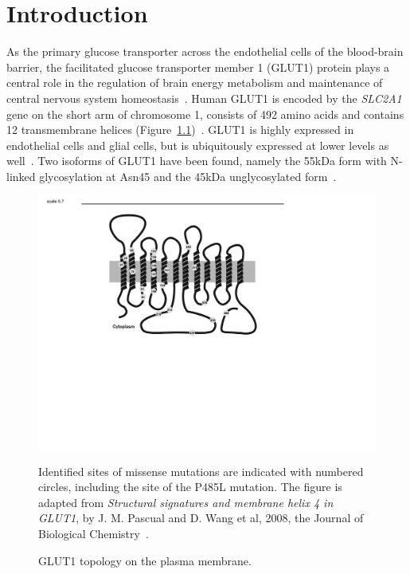 
\chapter{Introduction} %
\label{Chapter1} %

\newcommand{\keyword}[1]{\textbf{#1}}
\newcommand{\tabhead}[1]{\textbf{#1}}
\newcommand{\code}[1]{\texttt{#1}}
\newcommand{\file}[1]{\texttt{\bfseries#1}}
\newcommand{\option}[1]{\texttt{\itshape#1}}

As the primary glucose transporter across the endothelial cells of the blood-brain barrier, the facilitated glucose transporter member 1 (GLUT1) protein plays a central role in the regulation of brain energy metabolism and maintenance of central nervous system homeostasis~\cite{Pascual}. Human GLUT1 is encoded by the \textit{SLC2A1} gene on the short arm of chromosome 1, consists of 492 amino acids and contains 12 transmembrane \textalpha{} helices (Figure~\ref{fig:topo})~\cite{MUECKLER,Uldry}. GLUT1 is highly expressed in endothelial cells and glial cells, but is ubiquitously expressed at lower levels as well~\cite{Lee,Wheeler}. Two isoforms of GLUT1 have been found, namely the 55kDa form with N-linked glycosylation at Asn45 and the 45kDa unglycosylated form~\cite{Paul-W.-Hruz,Duelli}.
\begin{figure}[h]
\centering
\includegraphics[scale=0.7]{Figures/topology}
\caption{GLUT1 topology on the plasma membrane.}
\vspace*{-3mm}
\small \justify
Identified sites of missense mutations are indicated with numbered circles, including the site of the P485L mutation. The figure is adapted from \textit{Structural signatures and membrane helix 4 in GLUT1}, by J. M. Pascual and D. Wang et al, 2008, the Journal of Biological Chemistry~\cite{Pascual}.
\label{fig:topo}
\end{figure}

